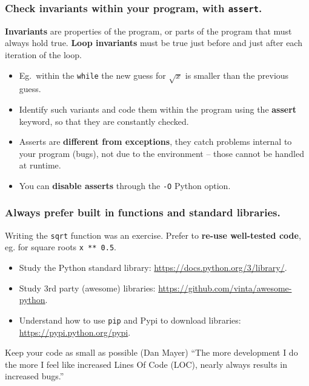\documentclass{beamer} %
\newcommand\emc[1]{\textcolor{brightblue}{\textbf{#1}}}
\begin{document}
\begin{frame}
\frametitle{Check invariants within your program, with \texttt{assert}.}

\begin{definition}\emc{Invariants} are properties of the program, or parts of the program that must always hold true. \emc{Loop invariants} must be true just before and just after each iteration of the loop.
\end{definition}

\begin{itemize}
	\item Eg.\ within the \texttt{while} the new guess for $\sqrt{x}$ is smaller than the previous guess.
	\item Identify such variants and code them within the program using the \emc{assert} keyword, so that they are constantly checked.
	\item Asserts are \emc{different from exceptions}, they catch problems internal to your program (bugs), not due to the environment -- those cannot be handled at runtime.
	\item You can \emc{disable asserts} through the \texttt{-O} Python option.
\end{itemize}

\end{frame}



\begin{frame}
\frametitle{Always prefer built in functions and standard libraries.}

Writing the \texttt{sqrt} function was an exercise. Prefer to \emc{re-use well-tested code}, eg.  for square roots \texttt{x ** 0.5}.
\begin{itemize}
	\item Study the Python standard library: \url{https://docs.python.org/3/library/}.
	\item Study 3rd party (awesome) libraries: \url{https://github.com/vinta/awesome-python}.
	\item Understand how to use \texttt{pip} and Pypi to download libraries: 
	\url{https://pypi.python.org/pypi}.
\end{itemize}

\begin{block}{Keep your code as small as possible (Dan Mayer)}
``The more development I do the more I feel like increased Lines Of Code (LOC), nearly always results in increased bugs.''
\end{block}

\end{frame}
\end{document}

